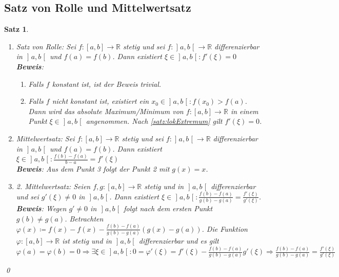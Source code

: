 \documentclass[ngerman,titlepage,twoside, parskip=half*]{scrreprt}
\newcommand*{\R}{\mathbb{R}}
\theoremstyle{break}
\newtheorem{theorem}{Satz}[section]
\theoremstyle{nonumberbreak}
\newcommand*{\bsofint}[1]{\mathopen{]}#1\mathclose{[}} %
\begin{document}
\subsection{Satz von Rolle und Mittelwertsatz}
\begin{theorem}
  \begin{enumerate}[(1)]
    \item Satz von Rolle: Sei $f\colon[a,b]\rightarrow\R$ stetig und sei $f\colon
      \bsofint{a,b}\rightarrow\R$ differenzierbar in $\bsofint{a,b}$ und $f(a)=f(b)$.
      Dann existiert $\xi\in \bsofint{a,b}\colon f'(\xi)=0$\\
      \textbf{Beweis}:\begin{enumerate}[1. F{a}ll]
	\item Falls $f$ konstant ist, ist der Beweis trivial.
	\item Falls $f$ nicht konstant ist, existiert ein $x_0\in
	  \bsofint{a,b}\colon f(x_0)>f(a)$. Dann wird das absolute Maximum/Minimum von
	  $f\colon[a,b]\rightarrow\R$ in einem Punkt $\xi\in\bsofint{a,b}$
	  angenommen. Nach \autoref{satz:lokExtremum} gilt $f'(\xi)=0$.
      \end{enumerate}
    \item Mittelwertsatz: Sei $f\colon[a,b]\rightarrow\R$ stetig und sei $f\colon
      \bsofint{a,b}\rightarrow\R$ differenzierbar in $\bsofint{a,b}$ und $f(a)=f(b)$. Dann
      existiert $\xi\in\bsofint{a,b}\colon\frac{f(b)-f(a)}{b-a}=f'(\xi)$\\
      \textbf{Beweis}: Aus dem Punkt 3 folgt der Punkt 2 mit $g(x)=x$.
    \item 2. Mittelwertsatz: Seien $f,g\colon[a,b]\rightarrow\R$ stetig und 
      in $\bsofint{a,b}$ differenzierbar und sei $g'(\xi)\neq 0$ in $\bsofint{a,b}$. 
      Dann existiert $\xi\in\bsofint{a,b}\colon\frac{f(b)-f(a)}{g(b)-g(a)}=
      \frac{f'(\xi)}{g'(\xi)}$.\\
      \textbf{Beweis}: Wegen $g'\neq 0$ in $\bsofint{a,b}$ folgt nach dem 
      ersten Punkt $g(b)\neq g(a)$. Betrachten $\varphi(x)\coloneqq f(x)-f(x)-
      \frac{f(b)-f(a)}{g(b)-g(a)}(g(x)-g(a))$. Die Funktion $\varphi\colon
      [a,b]\rightarrow\R$ ist stetig und in $\bsofint{a,b}$ differenzierbar und
      es gilt $\varphi (a)=\varphi(b)=0\Rightarrow \exists\xi\in\bsofint{a,b}\colon
      0=\varphi'(\xi)=f'(\xi)-\frac{f(b)-f(a)}{g(b)-g(a)}g'(\xi)
      \Rightarrow \frac{f(b)-f(a)}{g(b)-g(a)}=\frac{f'(\xi)}{g'(\xi)}$
  \end{enumerate}
  \qed
\end{theorem}
\end{document}
